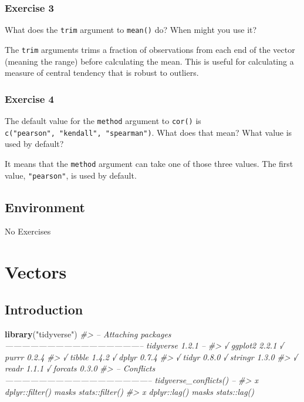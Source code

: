 \documentclass[]{book}
\newenvironment{Shaded}{\begin{snugshade}}{\end{snugshade}}
\newcommand{\CommentTok}[1]{\textcolor[rgb]{0.56,0.35,0.01}{\textit{#1}}}
\newcommand{\KeywordTok}[1]{\textcolor[rgb]{0.13,0.29,0.53}{\textbf{#1}}}
\newcommand{\NormalTok}[1]{#1}
\newcommand{\StringTok}[1]{\textcolor[rgb]{0.31,0.60,0.02}{#1}}
\theoremstyle{definition}
\theoremstyle{definition}
\theoremstyle{definition}
\theoremstyle{remark}
\begin{document}
\hypertarget{exercise-3-34}{%
\subsection{Exercise 3}\label{exercise-3-34}}

What does the \texttt{trim} argument to \texttt{mean()} do? When might
you use it?

The \texttt{trim} arguments trims a fraction of observations from each
end of the vector (meaning the range) before calculating the mean. This
is useful for calculating a measure of central tendency that is robust
to outliers.

\hypertarget{exercise-4-27}{%
\subsection{Exercise 4}\label{exercise-4-27}}

The default value for the \texttt{method} argument to \texttt{cor()} is
\texttt{c("pearson",\ "kendall",\ "spearman")}. What does that mean?
What value is used by default?

It means that the \texttt{method} argument can take one of those three
values. The first value, \texttt{"pearson"}, is used by default.

\hypertarget{environment}{%
\section{Environment}\label{environment}}

No Exercises

\hypertarget{vectors}{%
\chapter{Vectors}\label{vectors}}

\hypertarget{introduction-12}{%
\section{Introduction}\label{introduction-12}}

\begin{Shaded}
\begin{Highlighting}[]
\KeywordTok{library}\NormalTok{(}\StringTok{"tidyverse"}\NormalTok{)}
\CommentTok{#> -- Attaching packages -------------------------------------------------- tidyverse 1.2.1 --}
\CommentTok{#> √ ggplot2 2.2.1     √ purrr   0.2.4}
\CommentTok{#> √ tibble  1.4.2     √ dplyr   0.7.4}
\CommentTok{#> √ tidyr   0.8.0     √ stringr 1.3.0}
\CommentTok{#> √ readr   1.1.1     √ forcats 0.3.0}
\CommentTok{#> -- Conflicts ----------------------------------------------------- tidyverse_conflicts() --}
\CommentTok{#> x dplyr::filter() masks stats::filter()}
\CommentTok{#> x dplyr::lag()    masks stats::lag()}
\end{Highlighting}
\end{Shaded}
\end{document}
